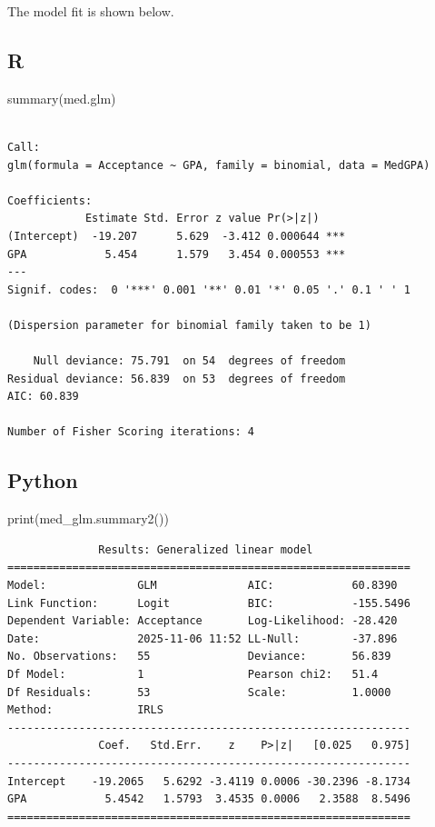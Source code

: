 \documentclass[
  a4paper,
  DIV=11,
  numbers=noendperiod]{scrreprt}
\newenvironment{Shaded}{\begin{snugshade}}{\end{snugshade}}
\newcommand{\BuiltInTok}[1]{\textcolor[rgb]{0.00,0.23,0.31}{#1}}
\newcommand{\FunctionTok}[1]{\textcolor[rgb]{0.28,0.35,0.67}{#1}}
\newcommand{\NormalTok}[1]{\textcolor[rgb]{0.00,0.23,0.31}{#1}}
\newenvironment{fbxSimple}[3]{\begin{tcolorbox}[enhanced, breakable,%
attach boxed title to top*={xshift=1.4pt},
boxed title style={boxrule=0.0mm, fuzzy shadow={1pt}{-1pt}{0mm}{0.1mm}{gray}, arc=.3em, rounded corners=east, sharp corners=west}, colframe=#1-color2, colbacktitle=#1-color1, colback = white, coltitle=black,  titlerule=0mm, toprule=0pt, bottomrule=.7pt, leftrule=.3em, rightrule=.7pt, outer arc=.3em,  	left=.5em, right=.5em, bottomtitle=1mm, toptitle=1mm,title=\textbf{#2}\hspace{0.5em}{#3}]}
{\end{tcolorbox}}
\begin{document}
\begin{fbxSimple}{Example}{Example 3}{}
The model fit is shown below.

\subsection{R}

\begin{Shaded}
\begin{Highlighting}[]
\FunctionTok{summary}\NormalTok{(med.glm)}
\end{Highlighting}
\end{Shaded}

\begin{verbatim}

Call:
glm(formula = Acceptance ~ GPA, family = binomial, data = MedGPA)

Coefficients:
            Estimate Std. Error z value Pr(>|z|)    
(Intercept)  -19.207      5.629  -3.412 0.000644 ***
GPA            5.454      1.579   3.454 0.000553 ***
---
Signif. codes:  0 '***' 0.001 '**' 0.01 '*' 0.05 '.' 0.1 ' ' 1

(Dispersion parameter for binomial family taken to be 1)

    Null deviance: 75.791  on 54  degrees of freedom
Residual deviance: 56.839  on 53  degrees of freedom
AIC: 60.839

Number of Fisher Scoring iterations: 4
\end{verbatim}

\subsection{Python}

\begin{Shaded}
\begin{Highlighting}[]
\BuiltInTok{print}\NormalTok{(med\_glm.summary2())}
\end{Highlighting}
\end{Shaded}

\begin{verbatim}
              Results: Generalized linear model
==============================================================
Model:              GLM              AIC:            60.8390  
Link Function:      Logit            BIC:            -155.5496
Dependent Variable: Acceptance       Log-Likelihood: -28.420  
Date:               2025-11-06 11:52 LL-Null:        -37.896  
No. Observations:   55               Deviance:       56.839   
Df Model:           1                Pearson chi2:   51.4     
Df Residuals:       53               Scale:          1.0000   
Method:             IRLS                                      
--------------------------------------------------------------
              Coef.   Std.Err.    z    P>|z|   [0.025   0.975]
--------------------------------------------------------------
Intercept    -19.2065   5.6292 -3.4119 0.0006 -30.2396 -8.1734
GPA            5.4542   1.5793  3.4535 0.0006   2.3588  8.5496
==============================================================
\end{verbatim}


\end{fbxSimple}
\end{document}
